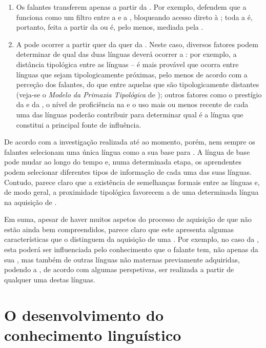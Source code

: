\documentclass[output=paper]{LSP/langsci}
\begin{document}
\begin{enumerate}
\item Os falantes transferem apenas a partir da . Por exemplo, \citet{bardelfalk2007} defendem que a  funciona como um filtro entre a  e a , bloqueando acesso direto à ; toda a  é, portanto, feita a partir da  ou é, pelo menos, mediada pela .

\item  A  pode ocorrer a partir quer da  quer da . Neste caso, diversos fatores podem determinar de qual das duas línguas deverá ocorrer a : por exemplo, a distância tipológica entre as línguas – é mais provável que ocorra  entre línguas que sejam tipologicamente próximas, pelo menos de acordo com a perceção dos falantes, do que entre aquelas que são tipologicamente distantes (veja-se o \textit{Modelo da Primazia Tipológica} de \citealt{rothman2011}); outros fatores como o prestígio da  e da , o nível de proficiência na  e o uso mais ou menos recente de cada uma das línguas poderão contribuir para determinar qual é a língua que constitui a principal fonte de influência. 
\end{enumerate}

De acordo com a investigação realizada até ao momento, porém, nem sempre os falantes selecionam uma única língua como a sua base para . A língua de base pode mudar ao longo do tempo e, numa determinada etapa, os aprendentes podem selecionar diferentes tipos de informação de cada uma das suas línguas. Contudo, parece claro que a existência de semelhanças formais entre as línguas e, de modo geral, a proximidade tipológica favorecem a  de uma determinada língua na aquisição de . 

Em suma, apesar de haver muitos aspetos do processo de aquisição de  que não estão ainda bem compreendidos, parece claro que este apresenta algumas características que o distinguem da aquisição de uma . Por exemplo, no caso da , esta poderá ser influenciada pelo conhecimento que o falante tem, não apenas da sua , mas também de outras línguas não maternas previamente adquiridas, podendo a , de acordo com algumas perspetivas, ser realizada a partir de qualquer uma destas línguas. 

\section{O desenvolvimento do conhecimento linguístico}
\label{sec:madeira_desenvol_conhecimento}
\end{document}
